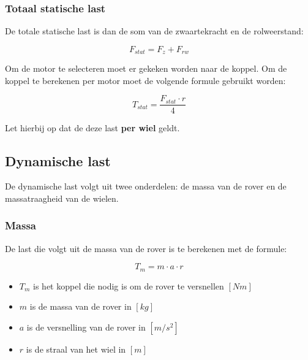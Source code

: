 \documentclass{article}
\begin{document}
        \subsubsection*{Totaal statische last}
            De totale statische last is dan de som van de zwaartekracht en de rolweerstand:

            \begin{equation}
                F_{stat} = F_{z} + F_{rw}
            \end{equation}

            Om de motor te selecteren moet er gekeken worden naar de koppel. 
            Om de koppel te berekenen per motor moet de volgende formule gebruikt worden:

            \begin{equation}
                T_{stat} = \frac{F_{stat} \cdot r}{4}
            \end{equation}

            Let hierbij op dat de deze last \textbf{per wiel} geldt.



    \subsection{Dynamische last}
        De dynamische last volgt uit twee onderdelen: de massa van de rover en de massatraagheid van de wielen.
        
        \subsubsection*{Massa}
            De last die volgt uit de massa van de rover is te berekenen met de formule:

            \begin{equation}
                T_{m} = m \cdot a \cdot r
            \end{equation}

            \begin{itemize}
                \item $T_{m}$ is het koppel die nodig is om de rover te versnellen $[Nm]$
                \item $m$ is de massa van de rover in $[kg]$
                \item $a$ is de versnelling van de rover in $[m/s^2]$
                \item $r$ is de straal van het wiel in $[m]$
            \end{itemize}
            
\end{document}
